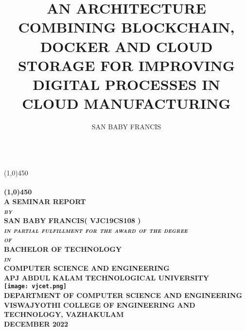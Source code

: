 \documentclass[10pt,a4paper]{report}
\title{AN ARCHITECTURE COMBINING BLOCKCHAIN, DOCKER AND CLOUD STORAGE FOR IMPROVING DIGITAL PROCESSES IN CLOUD MANUFACTURING}
\author{SAN BABY FRANCIS}
\begin{document}
\begin{titlepage}
	\begin{center}

	\textsc{\Large\mdseries}\\
	\line(1,0){450}\\
	[0.20in]
	\Large\bfseries\textbf{}\\
	[0.20mm]
	\line(1,0){450}\\
	[1cm]
	\textsc{\large\mdseries A SEMINAR REPORT}\\	
	[0.30cm]
	\textsc{\large\itshape\mdseries by}\\	
	[0.60cm]
	\textsc{\large SAN BABY FRANCIS( VJC19CS108 )}\\
	[0.60cm]
	\textsc{\large\itshape\mdseries in partial fulfillment for the award of the degree}\\
	[0.50cm]
	\textsc{\large\itshape\mdseries of}\\
	[0.50cm]
	\textsc{\large\bfseries BACHELOR OF TECHNOLOGY}\\
	[0.50cm]
	\textsc{\large\itshape\mdseries in}\\
	[0.50cm]
	\textsc{\large\bfseries COMPUTER SCIENCE AND ENGINEERING}\\
	[0.40cm]
	\textsc{\large\bfseries APJ ABDUL KALAM TECHNOLOGICAL UNIVERSITY}\\	
	[1.5cm]
	\texttt{[image: vjcet.png]}\\
	[1.5cm]
	\textsc{\large\bfseries DEPARTMENT OF COMPUTER SCIENCE AND ENGINEERING}\\
	[0.05cm]
	\textsc{\large\bfseries VISWAJYOTHI COLLEGE OF ENGINEERING AND}\\
	[0.05cm]
	\textsc{\large\bfseries TECHNOLOGY, VAZHAKULAM}\\
	[1cm]
	\textsc{\large\bfseries DECEMBER 2022}\\

	\end{center}

\end{titlepage}



\newpage
\end{document}
